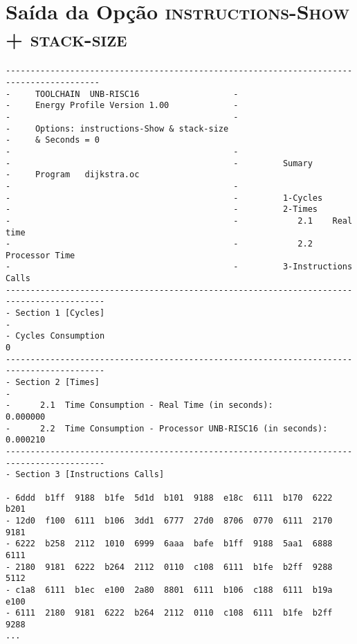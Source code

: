 \section{Saída da Opção \textsc{instructions-Show + stack-size}}
\scriptsize
\begin{verbatim}
-----------------------------------------------------------------------------------------
-     TOOLCHAIN  UNB-RISC16                   -                                          
-     Energy Profile Version 1.00             -                                             
-                                             -                                            
-     Options: instructions-Show & stack-size                                            
-     & Seconds = 0
-                                             -                                            
-                                             -         Sumary                       
-     Program   dijkstra.oc
-                                             -                                            
-                                             -         1-Cycles                     
-                                             -         2-Times                      
-                                             -            2.1    Real time           
-                                             -            2.2    Processor Time      
-                                             -         3-Instructions Calls          
------------------------------------------------------------------------------------------
- Section 1 [Cycles]                                                                      
-                                                                                         
- Cycles Consumption                                                   0                 
------------------------------------------------------------------------------------------
- Section 2 [Times]                                                                       
-                                                                                         
-      2.1  Time Consumption - Real Time (in seconds):                0.000000                 
-      2.2  Time Consumption - Processor UNB-RISC16 (in seconds):     0.000210                 
------------------------------------------------------------------------------------------
- Section 3 [Instructions Calls]                                                          

- 6ddd  b1ff  9188  b1fe  5d1d  b101  9188  e18c  6111  b170  6222  b201 
- 12d0  f100  6111  b106  3dd1  6777  27d0  8706  0770  6111  2170  9181 
- 6222  b258  2112  1010  6999  6aaa  bafe  b1ff  9188  5aa1  6888  6111 
- 2180  9181  6222  b264  2112  0110  c108  6111  b1fe  b2ff  9288  5112 
- c1a8  6111  b1ec  e100  2a80  8801  6111  b106  c188  6111  b19a  e100 
- 6111  2180  9181  6222  b264  2112  0110  c108  6111  b1fe  b2ff  9288 
...


\end{verbatim}
